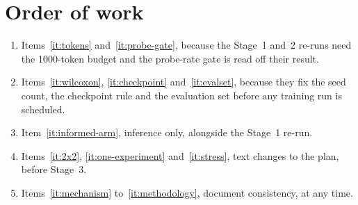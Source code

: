 \documentclass[11pt,a4paper]{article}
\begin{document}
\begin{enumerate}[leftmargin=1.8em, itemsep=0.8em, resume]
\end{enumerate}

\section{Order of work}

\begin{enumerate}[leftmargin=1.8em]
  \item Items~\ref{it:tokens} and~\ref{it:probe-gate}, because the Stage~1
  and~2 re-runs need the 1000-token budget and the probe-rate gate is read
  off their result.
  \item Items~\ref{it:wilcoxon}, \ref{it:checkpoint} and~\ref{it:evalset},
  because they fix the seed count, the checkpoint rule and the evaluation
  set before any training run is scheduled.
  \item Item~\ref{it:informed-arm}, inference only, alongside the Stage~1
  re-run.
  \item Items~\ref{it:2x2}, \ref{it:one-experiment} and~\ref{it:stress},
  text changes to the plan, before Stage~3.
  \item Items~\ref{it:mechanism} to~\ref{it:methodology}, document
  consistency, at any time.
\end{enumerate}
\end{document}
